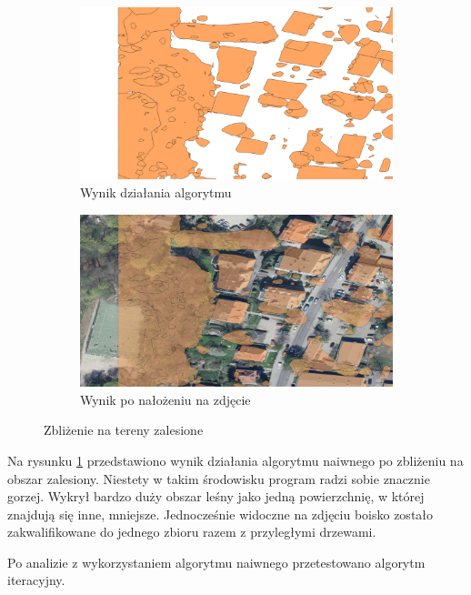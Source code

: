 \begin{figure}[h!]
    \centering
    \begin{subfigure}[b]{0.5\linewidth}
        \includegraphics[width=\linewidth]{img/wynik_naiwny_las.png}
        \caption{Wynik działania algorytmu}
    \end{subfigure}%
    \begin{subfigure}[b]{0.5\linewidth}
        \includegraphics[width=\linewidth]{img/wynik_naiwny_las_real.png}
        \caption{Wynik po nałożeniu na zdjęcie}
    \end{subfigure}%
    \caption{Zbliżenie na tereny zalesione}
    \label{fig:wynik_naiwny_las}
\end{figure}

Na rysunku \ref{fig:wynik_naiwny_las} przedstawiono wynik działania algorytmu naiwnego po
zbliżeniu na obszar zalesiony. Niestety w takim środowisku program radzi sobie znacznie gorzej.
Wykrył bardzo duży obszar leśny jako jedną powierzchnię, w której znajdują się inne, mniejsze.
Jednocześnie widoczne na zdjęciu boisko zostało zakwalifikowane do jednego zbioru razem z 
przyległymi drzewami.

Po analizie z wykorzystaniem algorytmu naiwnego przetestowano algorytm iteracyjny.


